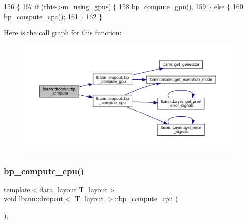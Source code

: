 \begin{DoxyCode}
156                               \{
157     \textcolor{keywordflow}{if} (this->\hyperlink{classlbann_1_1Layer_af7881cb5eff5207c15fa835d65462e8f}{m\_using\_gpus}) \{
158       \hyperlink{classlbann_1_1dropout_aeafadecbcfc81734d0c1850b4004dcc3}{bp\_compute\_gpu}();
159     \} \textcolor{keywordflow}{else} \{
160       \hyperlink{classlbann_1_1dropout_aca0160de0c3db5c29a0c4c6bddd0cf4f}{bp\_compute\_cpu}();
161     \}
162   \}
\end{DoxyCode}
Here is the call graph for this function\+:\nopagebreak
\begin{figure}[H]
\begin{center}
\leavevmode
\includegraphics[width=350pt]{classlbann_1_1dropout_a053e3f392a6a90b3bcc07f62f3818bce_cgraph}
\end{center}
\end{figure}
\mbox{\label{classlbann_1_1dropout_aca0160de0c3db5c29a0c4c6bddd0cf4f}} 
\subsubsection{\texorpdfstring{bp\+\_\+compute\+\_\+cpu()}{bp\_compute\_cpu()}}
{\footnotesize\ttfamily template$<$data\+\_\+layout T\+\_\+layout$>$ \\
void \hyperlink{classlbann_1_1dropout}{lbann\+::dropout}$<$ T\+\_\+layout $>$\+::bp\+\_\+compute\+\_\+cpu (\begin{DoxyParamCaption}{ }\end{DoxyParamCaption})\hspace{0.3cm}{\ttfamily [inline]}, {\ttfamily [private]}}

